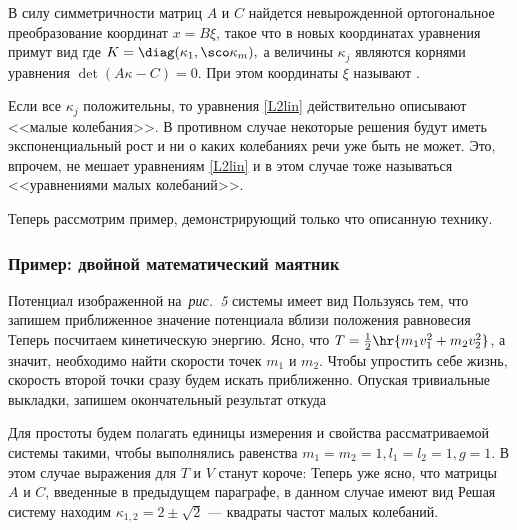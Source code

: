 В силу симметричности матриц $A$ и $C$ найдется невырожденной
ортогональное преобразование координат $x=B\xi$, такое что в новых
координатах уравнения примут вид  где
$K=\diag(\kappa_1,\sco\kappa_m),$ а величины $\kappa_j$ являются
корнями уравнения $\det(A\kappa-C)=0.$ При этом координаты $\xi$
называют .
\begin{note}
Если все $\kappa_j$ положительны, то уравнения \eqref{L2lin}
действительно описывают <<малые колебания>>. В противном случае
некоторые решения будут иметь экспоненциальный рост и ни о каких
колебаниях речи уже быть не может. Это, впрочем, не мешает
уравнениям \eqref{L2lin} и в этом случае тоже называться <<уравнениями
малых колебаний>>.
\end{note}
Теперь рассмотрим пример, демонстрирующий только что описанную
технику.

\subsubsection{Пример: двойной математический маятник}


Потенциал изображенной на~\emph{рис.~5}
системы имеет вид
 Пользуясь тем, что
запишем приближенное значение потенциала вблизи положения равновесия
 Теперь посчитаем кинетическую
энергию. Ясно, что $T=\frac{1}{2}\hr{m_1v_1^2+m_2v_2^2}$, а значит, необходимо найти скорости точек
$m_1$ и $m_2$. Чтобы упростить себе жизнь, скорость второй точки сразу будем искать приближенно.
Опуская тривиальные выкладки, запишем окончательный результат  откуда

Для простоты будем полагать единицы измерения и свойства
рассматриваемой системы такими, чтобы выполнялись равенства
$m_1=m_2=1, l_1=l_2=1, g=1$. В этом случае выражения для $T$ и $V$
станут короче:
 Теперь уже ясно, что
матрицы $A$ и $C$, введенные в предыдущем параграфе, в данном случае
имеют вид \equ{A=\rbmat{2&1\\1&1},\ C=\rbmat{2&0\\0&1}.} Решая
систему 
находим $\kappa_{1,2}=2\pm\sqrt{2}$ --- квадраты частот малых
колебаний.

